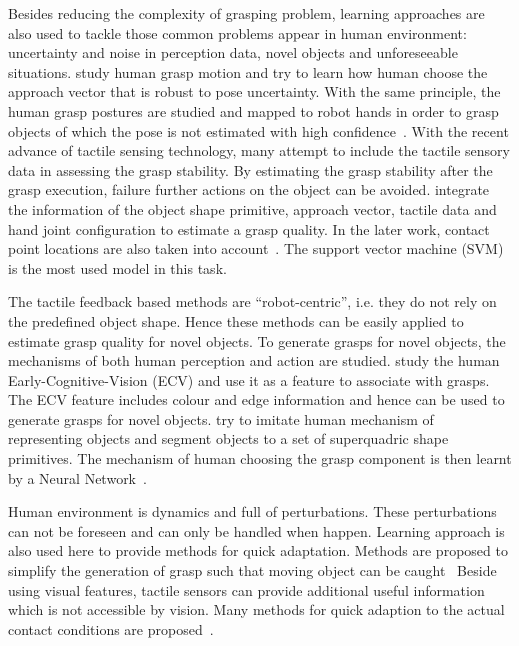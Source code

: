 Besides reducing the complexity of grasping problem, learning approaches are also used to tackle those common problems appear in human environment: uncertainty and noise in perception data, novel objects and unforeseeable situations. \citet{ekvall2007learning,stulp2011learning} study human grasp motion and try to learn how human choose the approach vector that is robust to pose uncertainty. With the same principle, the human grasp postures are studied and mapped to robot hands in order to grasp objects of which the pose is not estimated with high confidence~\citep{tegin2009demonstration}. With the recent advance of tactile sensing technology, many attempt to include the tactile sensory data in assessing the grasp stability. By estimating the grasp stability after the grasp execution, failure further actions on the object can be avoided. \citet{bekiroglu2011assessing} integrate the information of the object shape primitive, approach vector, tactile data and hand joint configuration to estimate a grasp quality.
In the later work, contact point locations are also taken into account~\citep{dang2012learning,dang2014stable}. The support vector machine (SVM) is the most used model in this task.

The tactile feedback based methods are ``robot-centric'', i.e. they do not rely on the predefined object shape. Hence these methods can be easily applied to estimate grasp quality for novel objects. To generate grasps for novel objects, the mechanisms of both human perception and action are studied. \citet{detry2009learning} study the human Early-Cognitive-Vision (ECV) and use it as a feature to associate with grasps. The ECV feature includes colour and edge information and hence can be used to generate grasps for novel objects.
\citet{el2007learning} try to imitate human mechanism of representing objects and segment objects to a set of superquadric shape primitives. The mechanism of human choosing the grasp component is then learnt by a Neural Network~\citep{el2010new}.



Human environment is dynamics and full of perturbations. These perturbations can not be foreseen and can only be handled when happen. Learning approach is also used here to provide methods for quick adaptation. Methods are proposed to simplify the generation of grasp such that moving object can be caught~\citep{harada2008fast,kim2012,bidan2013grasp}
Beside using visual features, tactile sensors can provide additional useful information which is not accessible by vision. Many methods for quick adaption to the actual contact conditions are proposed~\citep{hsiao2010contact,hsiao2011robust,kazemi2012robust,sauser2011iterative,li2014learning}.




